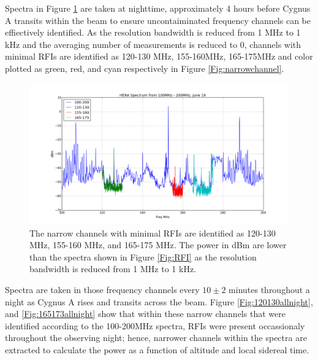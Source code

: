\documentclass[preprint]{aastex}  %
\begin{document}
Spectra in Figure \ref{Fig:narrowchannels} are taken at nighttime, approximately 4 hours before Cygnus A transits within the beam to ensure uncontaiminated frequency channels can be effiectively identified. As the resolution bandwidth is reduced from 1 MHz to 1 kHz and the averaging number of measurements is reduced to 0, channels with minimal RFIs are identified as 120-130 MHz, 155-160MHz, 165-175MHz and color plotted as green, red, and cyan respectively in Figure \ref{Fig:narrowchannel}.
\begin{figure}[H]
	\begin{center}
	\includegraphics[width =.8\textwidth]{spectra_plots/all_channels}
	\caption{The narrow channels with minimal RFIs are identified as 120-130 MHz, 155-160 MHz, and 165-175 MHz. The power in dBm are lower than the spectra shown in Figure \ref{Fig:RFI} as the resolution bandwidth is reduced from 1 MHz to 1 kHz.
\label{Fig:narrowchannels} }
	\end{center}
\end{figure}
\clearpage

Spectra are taken in those frequency channels every $10\pm2$ minutes throughout a night as Cygnus A rises and transits across the beam. Figure \ref{Fig:120130allnight}, and \ref{Fig:165173allnight} show that within these narrow channels that were identified according to the 100-200MHz spectra, RFIs were present occassionaly throughout the observing night; hence, narrower channels within the spectra are extracted to calculate the power as a function of altitude and local sidereal time.
\end{document}
